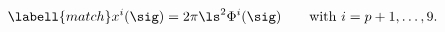 \begin{equation}
\labell{match}
x^i(\sig)=2\pi\ls^2\Phi^i(\sig)\qquad {\rm with}\ i=p+1,\ldots,9.
\end{equation}

